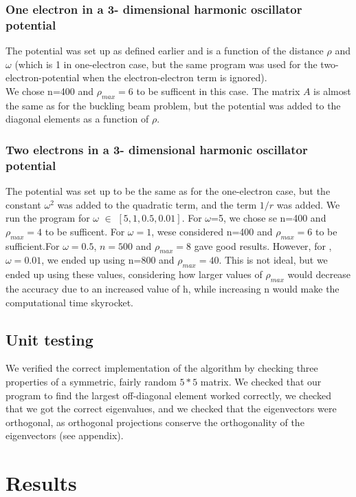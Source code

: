\documentclass[10pt,a4paper]{article}
\begin{document}
\subsubsection{One electron in a 3- dimensional harmonic oscillator potential}
The potential was set up as defined earlier and is a function of the distance $\rho$ and $\omega$ (which is 1 in one-electron case, but the same program was used for the two-electron-potential when the electron-electron term is ignored). \\
We chose n=400 and  $\rho_{max}=6$ to be sufficent in this case. The matrix $A$ is almost the same as for the buckling beam problem, but the potential was added to the diagonal elements as a function of $\rho$.
\subsubsection{Two electrons in a 3- dimensional harmonic oscillator potential}
The potential was set up to be the same as for the one-electron case, but the constant  $\omega^2$ was added to the quadratic term, and the term $1/r$ was added. We run the program for  $\omega$ $\in$ $[5,1,0.5,0.01]$. 
For $\omega$=5, we chose se n=400 and  $\rho_{max}=4$ to be sufficent. For $\omega=1$, wese considered n=400 and  $\rho_{max}=6$ to be sufficient.For $\omega=0.5$, $n=500$ and  $\rho_{max}=8$ gave good results. However, for ,$\omega=0.01$, we ended up using n=800 and   $\rho_{max}=40$. This is not ideal, but we ended up using these values, considering how larger values of  $\rho_{max}$ would decrease the accuracy due to an increased value of h, while increasing n would make the computational time skyrocket. 

\subsection{Unit testing}
We verified the correct implementation of the algorithm by checking three properties of a symmetric, fairly random $5*5$ matrix. We checked that our program to find the largest off-diagonal element worked correctly, we checked that we got the correct eigenvalues, and we checked that the eigenvectors were orthogonal, as orthogonal projections conserve the orthogonality of the eigenvectors (see appendix). 
\section{Results}
\end{document}
